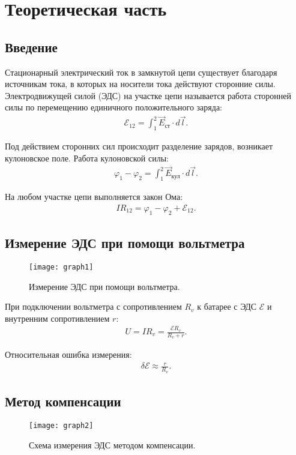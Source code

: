 \section{Теоретическая часть}

\subsection{Введение}
Стационарный электрический ток в замкнутой цепи существует благодаря источникам тока, в которых на носители тока действуют сторонние силы. Электродвижущей силой (ЭДС) на участке цепи называется работа сторонней силы по перемещению единичного положительного заряда:
\begin{align} \label{eq:1}
	\mathcal{E}_{12} = \int_{1}^{2} \vec{E}_{\text{ст}} \cdot d\vec{l}.
\end{align}

Под действием сторонних сил происходит разделение зарядов, возникает кулоновское поле. Работа кулоновской силы:
\begin{align} \label{eq:2}
	\varphi_1 - \varphi_2 = \int_{1}^{2} \vec{E}_{\text{кул}} \cdot d\vec{l}.
\end{align}

На любом участке цепи выполняется закон Ома:
\begin{align} \label{eq:3}
	I R_{12} = \varphi_1 - \varphi_2 + \mathcal{E}_{12}.
\end{align}

\subsection{Измерение ЭДС при помощи вольтметра}
\begin{figure}[H]
	\centering
	\texttt{[image: graph1]}
	\caption{Измерение ЭДС при помощи вольтметра.}
	\label{fig:1}
\end{figure}

При подключении вольтметра с сопротивлением $R_v$ к батарее с ЭДС $\mathcal{E}$ и внутренним сопротивлением $r$:
\begin{align} \label{eq:4}
	U = I R_v = \frac{\mathcal{E} R_v}{R_v + r}.
\end{align}

Относительная ошибка измерения:
\begin{align} \label{eq:5}
	\delta\mathcal{E} \approx \frac{r}{R_v}.
\end{align}

\subsection{Метод компенсации}
\begin{figure}[H]
	\centering
	\texttt{[image: graph2]}
	\caption{Схема измерения ЭДС методом компенсации.}
	\label{fig:2}
\end{figure}

